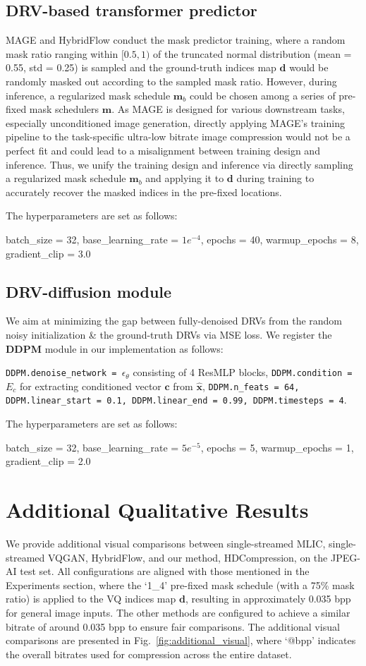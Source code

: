 \subsection{DRV-based transformer predictor} MAGE and HybridFlow conduct the mask predictor training, where a random mask ratio ranging within $[0.5, 1)$ of the truncated normal distribution (mean = 0.55, std = 0.25) is sampled and the ground-truth indices map $\textbf{d}$ would be randomly masked out according to the sampled mask ratio. However, during inference, a regularized mask schedule $\textbf{m}_{b}$ could be chosen among a series of pre-fixed mask schedulers $\textbf{m}$. As MAGE is designed for various downstream tasks, especially unconditioned image generation, directly applying MAGE’s training pipeline to the task-specific ultra-low bitrate image compression would not be a perfect fit and could lead to a misalignment between training design and inference. Thus, we unify the training design and inference via directly sampling a regularized mask schedule $\textbf{m}_{b}$ and applying it to $\textbf{d}$ during training to accurately recover the masked indices in the pre-fixed locations.

The hyperparameters are set as follows:

batch\_size = 32, base\_learning\_rate = $1e^{-4}$, epochs = 40, warmup\_epochs = 8, gradient\_clip = 3.0

\subsection{DRV-diffusion module} We aim at minimizing the gap between fully-denoised DRVs from the random noisy initialization \& the ground-truth DRVs via MSE loss. We register the \textbf{DDPM} module in our implementation as follows:

\texttt{DDPM.denoise\_network = $\epsilon_{\theta}$} consisting of 4 ResMLP blocks,
\texttt{DDPM.condition = $E_{c}$} for extracting conditioned vector $\textbf{c}$ from $\hat{\textbf{x}}$, 
\texttt{DDPM.n\_feats = 64, DDPM.linear\_start = 0.1, DDPM.linear\_end = 0.99, DDPM.timesteps = 4}. 

The hyperparameters are set as follows:

batch\_size = 32, base\_learning\_rate = $5e^{-5}$, epochs = 5, warmup\_epochs = 1, gradient\_clip = 2.0

\section{Additional Qualitative Results}
We provide additional visual comparisons between single-streamed MLIC, single-streamed VQGAN, HybridFlow, and our method, HDCompression, on the JPEG-AI test set. All configurations are aligned with those mentioned in the Experiments section, where the ‘1\_4’ pre-fixed mask schedule (with a 75\% mask ratio) is applied to the VQ indices map $\textbf{d}$, resulting in approximately 0.035 bpp for general image inputs. The other methods are configured to achieve a similar bitrate of around 0.035 bpp to ensure fair comparisons. The additional visual comparisons are presented in Fig.~\ref{fig:additional_visual}, where ‘@bpp’ indicates the overall bitrates used for compression across the entire dataset.
